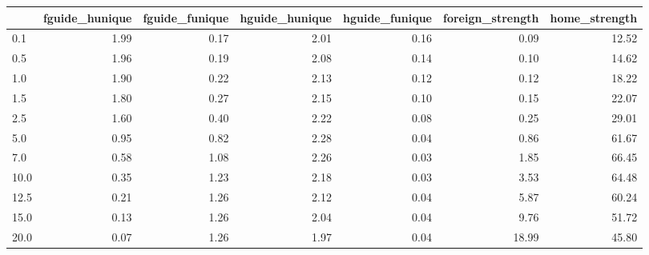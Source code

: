 \begin{tabular}{lrrrrrr}
\toprule
 & fguide_hunique & fguide_funique & hguide_hunique & hguide_funique & foreign_strength & home_strength \\
\midrule
0.1 & 1.99 & 0.17 & 2.01 & 0.16 & 0.09 & 12.52 \\
0.5 & 1.96 & 0.19 & 2.08 & 0.14 & 0.10 & 14.62 \\
1.0 & 1.90 & 0.22 & 2.13 & 0.12 & 0.12 & 18.22 \\
1.5 & 1.80 & 0.27 & 2.15 & 0.10 & 0.15 & 22.07 \\
2.5 & 1.60 & 0.40 & 2.22 & 0.08 & 0.25 & 29.01 \\
5.0 & 0.95 & 0.82 & 2.28 & 0.04 & 0.86 & 61.67 \\
7.0 & 0.58 & 1.08 & 2.26 & 0.03 & 1.85 & 66.45 \\
10.0 & 0.35 & 1.23 & 2.18 & 0.03 & 3.53 & 64.48 \\
12.5 & 0.21 & 1.26 & 2.12 & 0.04 & 5.87 & 60.24 \\
15.0 & 0.13 & 1.26 & 2.04 & 0.04 & 9.76 & 51.72 \\
20.0 & 0.07 & 1.26 & 1.97 & 0.04 & 18.99 & 45.80 \\
\bottomrule
\end{tabular}
